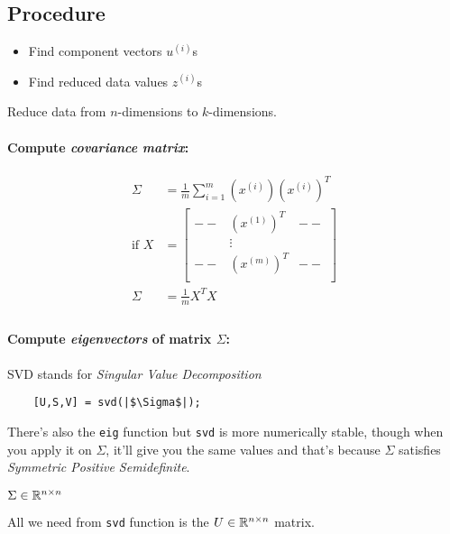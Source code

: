 \subsection{Procedure}
\begin{itemize}
	\item Find component vectors $u^{(i)}$s
	\item Find reduced data values $z^{(i)}$s
\end{itemize}

Reduce data from $n$-dimensions to $k$-dimensions.
\paragraph{Compute \emph{covariance matrix}:}
\begin{align*}
	\Sigma       & = \frac{1}{m} \sum_{i=1}^m(x^{(i)})(x^{(i)})^T \\
	\text{if } X & = \begin{bmatrix}
		-- & (x^{(1)})^T & -- \\
		   & \vdots      &    \\
		-- & (x^{(m)})^T & -- \\
	\end{bmatrix}                    \\
	\Sigma       & = \frac{1}{m} X^TX                             \\
\end{align*}

\paragraph{Compute \emph{eigenvectors} of matrix $\Sigma$:}
SVD stands for \emph{Singular Value Decomposition}
\begin{verbatim}
	[U,S,V] = svd(|$\Sigma$|);
\end{verbatim}
There's also the \texttt{eig} function but \texttt{svd}
is more numerically stable, though when you apply it on $\Sigma$, it'll give you
the same values and that's because $\Sigma$ satisfies \emph{Symmetric Positive
	Semidefinite}.
\begin{remark}
	$\Sigma \in \mathbb{R}^{n \times n}$
\end{remark}
All we need from \texttt{svd} function is the $U \in \mathbb{R}^{n \times n}$ matrix.

